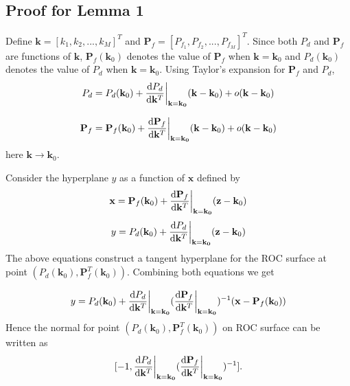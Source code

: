 \documentclass[12pt,journal,a4paper,twoside,onecolumn,draft]{IEEEtran}
\begin{document}
\begin{spacing}{2.5}
\appendix
\subsection{Proof for Lemma 1}

Define $\mathbf{k} = [k_1, k_2, ..., k_M]^T$ and $\mathbf{P}_f = [P_{f_1}, P_{f_2}, ..., P_{f_M}]^T$. Since both $P_d$ and $\mathbf{P}_f$ are functions of $\mathbf{k}$, $\mathbf{P}_f(\mathbf{k}_0)$ denotes the value of $\mathbf{P}_f$ when $\mathbf{k} = \mathbf{k}_0$ and $P_d(\mathbf{k}_0)$ denotes the value of $P_d$ when $\mathbf{k} = \mathbf{k}_0$. Using Taylor's expansion for $\mathbf{P}_f$ and $P_d$,
\begin{equation}
\label{pro: pd}
P_d = P_d(\mathbf{k}_0) + \frac{\mathrm{d}P_d}{\mathrm{d}\mathbf{k}^T}\bigg{|}_{\mathbf{k}=\mathbf{k_0}}(\mathbf{k} - \mathbf{k}_0)
+ o(\mathbf{k} - \mathbf{k}_0)
\end{equation}

\begin{equation}
\label{pro: pf}
\mathbf{P}_f = \mathbf{P}_f(\mathbf{k}_0) + \frac{\mathrm{d}\mathbf{P}_f}{\mathrm{d}\mathbf{k}^T}\bigg{|}_{\mathbf{k}=\mathbf{k_0}}(\mathbf{k} - \mathbf{k}_0)
+ o(\mathbf{k} - \mathbf{k}_0)
\end{equation}
here $\mathbf{k} \rightarrow \mathbf{k}_0$.

Consider the hyperplane $y$ as a function of $\mathbf{x}$ defined by
\begin{equation}
\label{pro: x}
\mathbf{x} = \mathbf{P}_f(\mathbf{k}_0) + \frac{\mathrm{d}\mathbf{P}_f}{\mathrm{d}\mathbf{k}^T}\bigg{|}_{\mathbf{k}=\mathbf{k_0}}(\mathbf{z} - \mathbf{k}_0)
\end{equation}
\begin{equation}
\label{pro: y}
y = P_d(\mathbf{k}_0) + \frac{\mathrm{d}P_d}{\mathrm{d}\mathbf{k}^T}\bigg{|}_{\mathbf{k}=\mathbf{k_0}}(\mathbf{z} - \mathbf{k}_0)
\end{equation}
The above equations construct a tangent hyperplane for the ROC surface at point $(P_d(\mathbf{k}_0), \mathbf{P}_f^T(\mathbf{k}_0))$. Combining both equations  we get

\begin{equation}
\label{pro : y2}
y = P_d(\mathbf{k}_0) + \frac{\mathrm{d}P_d}{\mathrm{d}\mathbf{k}^T}\bigg{|}_{\mathbf{k}=\mathbf{k_0}}(
\frac{\mathrm{d}\mathbf{P}_f}{\mathrm{d}\mathbf{k}^T}\bigg{|}_{\mathbf{k}=\mathbf{k_0}}
)^{-1} (\mathbf{x} - \mathbf{P}_f(\mathbf{k}_0))
\end{equation}
Hence the normal for point $(P_d(\mathbf{k}_0), \mathbf{P}_f^T(\mathbf{k}_0))$ on ROC surface can be written as
\begin{equation}
\label{vec: normal}
[-1, \frac{\mathrm{d}P_d}{\mathrm{d}\mathbf{k}^T}\bigg{|}_{\mathbf{k}=\mathbf{k_0}}(
\frac{\mathrm{d}\mathbf{P}_f}{\mathrm{d}\mathbf{k}^T}\bigg{|}_{\mathbf{k}=\mathbf{k_0}}
)^{-1}
].
\end{equation}


\end{spacing}
\end{document}
